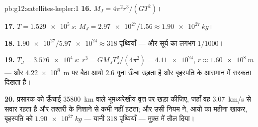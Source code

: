 \begin{solution}{pb:g12:satellites-kepler:1}
\textbf{16.} $M_J = 4\pi^2 r^3/(G T^2)$।

\textbf{17.} $T = \qty{1.529e5}{s}$: $M_J =
\num{2.97e27}/1.56 \approx \qty{1.90e27}{kg}$।

\textbf{18.} $\num{1.90e27}/\num{5.97e24} \approx 318$ पृथ्वियाँ --- और सूर्य का लगभग $1/1000$।

\textbf{19.} $T_J = \qty{3.576e4}{s}$: $r^3 = GM_J T_J^2/(4\pi^2) =
\num{4.11e24}$, $r \approx \qty{1.60e8}{m}$ --- और \qty{4.22e8}{m} पर बैठा आयो $2.6$ गुना
ऊँचा उड़ता है और बृहस्पति के आसमान में सरकता दिखता है।

\textbf{20.} प्रसारक को ऊँचाई \qty{35800}{km} वाले भूमध्यरेखीय वृत्त पर खड़ा कीजिए,
जहाँ वह \qty{3.07}{km/s} से सवार रहता है और तश्तरी के निशाने से कभी नहीं हटता; और उसी
नियम ने, आयो का महीना खाकर, बृहस्पति को $\qty{1.90e27}{kg}$ --- यानी $318$ पृथ्वियाँ ---
मुफ़्त में तौल दिया।
\end{solution}
